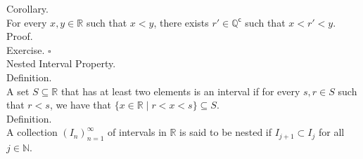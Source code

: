 \documentclass[twocolumn]{article}
\newcommand{\qed}{$\square$}
\newcommand{\COMPLEMENT}{^\mathsf{c}}
\let\complement\COMPLEMENT
\newcommand{\naturals}{\mathbb{N}}
\newcommand{\rationals}{\mathbb{Q}}
\newcommand{\irrationals}{\rationals\complement}
\newcommand{\reals}{\mathbb{R}}
\begin{document}
Corollary. \\
For every $x, y \in \reals$ such that $x < y$, there exists $r' \in \irrationals$ such that $x < r' < y$. \\
Proof. \\
Exercise. \qed \\

Nested Interval Property. \\

Definition. \\
A set $S \subseteq \reals$ that has at least two elements is an interval if for every $s, r \in S$ such that $r < s$, we have that $\{ x \in \reals \mid r < x < s \} \subseteq S$. \\

Definition. \\
A collection $(I_n)_{n = 1}^\infty$ of intervals in $\reals$ is said to be nested if $I_{j + 1} \subset I_j$ for all $j \in \naturals$. \\
\end{document}
